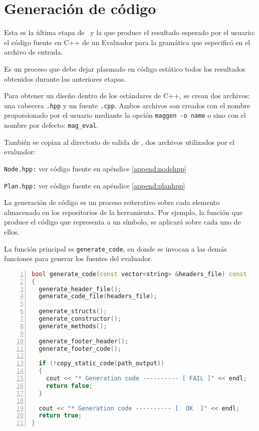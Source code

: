 \section{Generación de código}

Esta es la última etapa de \maggen\ y la que produce el resultado esperado por el usuario: el código fuente en C++ de un Evaluador para la gramática que especificó en el archivo de entrada.

Es un proceso que debe dejar plasmado en código estático todos los resultados obtenidos durante las anteriores etapas.

Para obtener un diseño dentro de los estándares de C++, se crean dos archivos: una cabecera \texttt{.hpp} y un fuente \texttt{.cpp}. Ambos archivos son creados con el nombre proporsionado por el usuario mediante la opción \texttt{maggen -o name} o sino con el nombre por defecto: \texttt{mag\_eval}.

También se copian al directorio de salida de \maggen, dos archivos utilizados por el evaluador:
\begin{items}
\item \texttt{Node.hpp:} ver código fuente en apéndice \ref{append:nodehpp}
\item \texttt{Plan.hpp:} ver código fuente en apéndice \ref{append:planhpp}
\end{items}

\vspace*{0.2cm}

La generación de código es un proceso reiterativo sobre cada elemento almacenado en los repositorios de la herramienta. Por ejemplo, la función que produce el código que representa a un símbolo, se aplicará sobre cada uno de ellos.

La función principal es \texttt{generate\_code}, en donde se invocan a las demás funciones para generar los fuentes del evaluador.

\vspace*{0.2cm}

\begin{lstlisting}[language=C++, basicstyle=\scriptsize, numbers=left, columns=fullflexible, linewidth=10cm]
bool generate_code(const vector<string> &headers_file) const
{
  generate_header_file();
  generate_code_file(headers_file);

  generate_structs();
  generate_constructor();
  generate_methods();

  generate_footer_header();
  generate_footer_code();

  if (!copy_static_code(path_output))
  {
    cout << "* Generation code ---------- [ FAIL ]" << endl;
    return false;
  }

  cout << "* Generation code ---------- [  OK  ]" << endl;
  return true;
}
\end{lstlisting}

